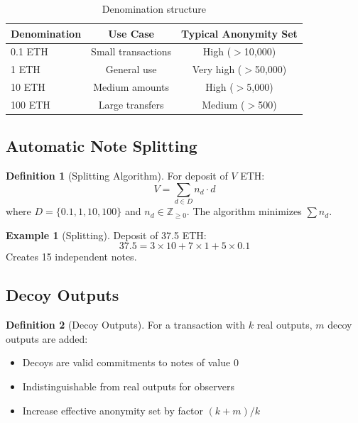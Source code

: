 \documentclass[11pt]{article}
\theoremstyle{definition}
\newtheorem{definition}{Definition}[section]
\newtheorem{example}{Example}[section]
\theoremstyle{plain}
\theoremstyle{remark}
\begin{document}
\begin{table}[H]
\centering
\caption{Denomination structure}
\label{tab:denominations}
\begin{tabular}{lcc}
\toprule
\textbf{Denomination} & \textbf{Use Case} & \textbf{Typical Anonymity Set} \\
\midrule
0.1 ETH & Small transactions & High ($>$10,000) \\
1 ETH & General use & Very high ($>$50,000) \\
10 ETH & Medium amounts & High ($>$5,000) \\
100 ETH & Large transfers & Medium ($>$500) \\
\bottomrule
\end{tabular}
\end{table}

\subsection{Automatic Note Splitting}

\begin{definition}[Splitting Algorithm]
For deposit of $V$ ETH:
\begin{equation}
V = \sum_{d \in D} n_d \cdot d
\end{equation}
where $D = \{0.1, 1, 10, 100\}$ and $n_d \in \mathbb{Z}_{\geq 0}$. The algorithm minimizes $\sum n_d$.
\end{definition}

\begin{example}[Splitting]
Deposit of 37.5 ETH:
\begin{equation}
37.5 = 3 \times 10 + 7 \times 1 + 5 \times 0.1
\end{equation}
Creates 15 independent notes.
\end{example}

\subsection{Decoy Outputs}

\begin{definition}[Decoy Outputs]
For a transaction with $k$ real outputs, $m$ decoy outputs are added:
\begin{itemize}
    \item Decoys are valid commitments to notes of value 0
    \item Indistinguishable from real outputs for observers
    \item Increase effective anonymity set by factor $(k+m)/k$
\end{itemize}
\end{definition}
\end{document}
